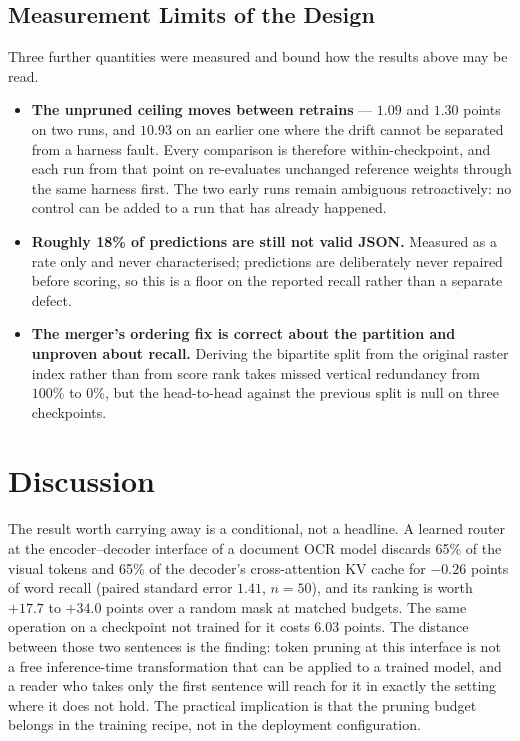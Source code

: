 \documentclass[conference]{IEEEtran}
\begin{document}
\subsection{Measurement Limits of the Design}
\label{sec:measurement}

Three further quantities were measured and bound how the results above may be read.

\begin{itemize}
\item \textbf{The unpruned ceiling moves between retrains} --- $1.09$ and $1.30$ points on
two runs, and $10.93$ on an earlier one where the drift cannot be separated from a harness
fault. Every comparison is therefore within-checkpoint, and each run from that point on
re-evaluates unchanged reference weights through the same harness first. The two early runs
remain ambiguous retroactively: no control can be added to a run that has already happened.
\item \textbf{Roughly 18\% of predictions are still not valid JSON.} Measured as a rate only
and never characterised; predictions are deliberately never repaired before scoring, so this
is a floor on the reported recall rather than a separate defect.
\item \textbf{The merger's ordering fix is correct about the partition and unproven about
recall.} Deriving the bipartite split from the original raster index rather than from score
rank takes missed vertical redundancy from $100\%$ to $0\%$, but the head-to-head against the
previous split is null on three checkpoints.
\end{itemize}

\section{Discussion}
\label{sec:discussion}

The result worth carrying away is a conditional, not a headline. A learned router at the
encoder--decoder interface of a document OCR model discards 65\% of the visual tokens and
65\% of the decoder's cross-attention KV cache for $-0.26$ points of word recall (paired
standard error $1.41$, $n = 50$), and its ranking is worth $+17.7$ to $+34.0$ points over a
random mask at matched budgets. The same operation on a checkpoint not trained for it costs
$6.03$ points. The distance between those two sentences is the finding: token pruning at this
interface is not a free inference-time transformation that can be applied to a trained model,
and a reader who takes only the first sentence will reach for it in exactly the setting where
it does not hold. The practical implication is that the pruning budget belongs in the
training recipe, not in the deployment configuration.
\end{document}
